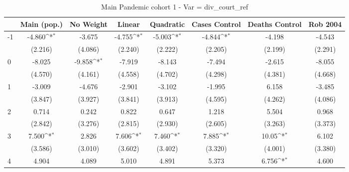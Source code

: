 \documentclass{article}
\begin{document}
{
\def\sym#1{\ifmmode^{#1}\else\(^{#1}\)\fi}
\begin{longtable}{l*{7}{c}}
\caption{Main Pandemic cohort 1 - Var = div\_court\_ref}\\
\hline\hline\endfirsthead\hline\endhead\hline\endfoot\endlastfoot
                &\multicolumn{1}{c}{Main (pop.)}&\multicolumn{1}{c}{No Weight}&\multicolumn{1}{c}{Linear}&\multicolumn{1}{c}{Quadratic}&\multicolumn{1}{c}{Cases Control}&\multicolumn{1}{c}{Deaths Control}&\multicolumn{1}{c}{Rob 2004}\\
\hline
-1              &   -4.860\sym{*}  &   -3.675         &   -4.755\sym{*}  &   -5.003\sym{*}  &   -4.844\sym{*}  &   -4.198         &   -4.543         \\
                &  (2.216)         &  (4.086)         &  (2.240)         &  (2.222)         &  (2.205)         &  (2.199)         &  (2.291)         \\
0               &   -8.025         &   -9.858\sym{*}  &   -7.919         &   -8.143         &   -7.494         &   -2.615         &   -8.055         \\
                &  (4.570)         &  (4.161)         &  (4.558)         &  (4.702)         &  (4.298)         &  (4.381)         &  (4.668)         \\
1               &   -3.009         &   -4.676         &   -2.901         &   -3.102         &   -1.995         &    6.158         &   -3.485         \\
                &  (3.847)         &  (3.927)         &  (3.841)         &  (3.913)         &  (4.595)         &  (4.262)         &  (4.086)         \\
2               &    0.714         &    0.242         &    0.822         &    0.647         &    1.218         &    5.504         &    0.968         \\
                &  (2.842)         &  (3.276)         &  (2.815)         &  (2.930)         &  (2.605)         &  (3.263)         &  (3.373)         \\
3               &    7.500\sym{*}  &    2.826         &    7.606\sym{*}  &    7.460\sym{*}  &    7.885\sym{*}  &    10.05\sym{*}  &    6.102         \\
                &  (3.586)         &  (3.010)         &  (3.602)         &  (3.402)         &  (3.320)         &  (4.001)         &  (3.380)         \\
4               &    4.904         &    4.089         &    5.010         &    4.891         &    5.373         &    6.756\sym{*}  &    4.600         \\

\end{longtable}}
\end{document}
